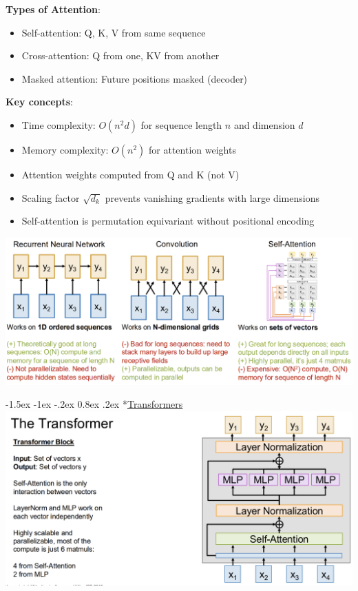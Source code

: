 \documentclass{article}
\makeatletter
\renewcommand\section{\@startsection{section}{1}{\z@}%
                                  {-1.5ex \@plus -1ex \@minus -.2ex}%
                                  {0.8ex \@plus.2ex}%
                                  {\normalfont\small\bfseries}}
\makeatother
\begin{document}
\begin{multicols}{3}
\textbf{Types of Attention}:
\begin{itemize}
\item Self-attention: Q, K, V from same sequence
\item Cross-attention: Q from one, KV from another
\item Masked attention: Future positions masked (decoder)
\end{itemize}

\textbf{Key concepts}:
\begin{itemize}
\item Time complexity: $O(n^2d)$ for sequence length $n$ and dimension $d$
\item Memory complexity: $O(n^2)$ for attention weights
\item Attention weights computed from Q and K (not V)
\item Scaling factor $\sqrt{d_k}$ prevents vanishing gradients with large dimensions
\item Self-attention is permutation equivariant without positional encoding
\end{itemize}

\includegraphics[width=\columnwidth]{imgs/seqs.png}

\section*{\underline{Transformers}}
\includegraphics[width=\columnwidth]{imgs/transformer.png}


\end{multicols}
\end{document}
